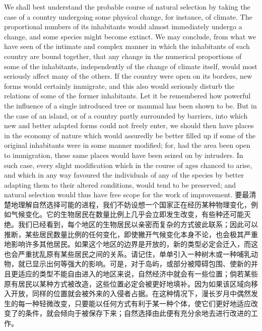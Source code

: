 \darwinpair
{We shall best understand the probable course of natural selection by taking the case of a country undergoing some physical change, for instance, of climate. The proportional numbers of its inhabitants would almost immediately undergo a change, and some species might become extinct. We may conclude, from what we have seen of the intimate and complex manner in which the inhabitants of each country are bound together, that any change in the numerical proportions of some of the inhabitants, independently of the change of climate itself, would most seriously affect many of the others. If the country were open on its borders, new forms would certainly immigrate, and this also would seriously disturb the relations of some of the former inhabitants. Let it be remembered how powerful the influence of a single introduced tree or mammal has been shown to be. But in the case of an island, or of a country partly surrounded by barriers, into which new and better adapted forms could not freely enter, we should then have places in the economy of nature which would assuredly be better filled up if some of the original inhabitants were in some manner modified; for, had the area been open to immigration, these same places would have been seized on by intruders. In such case, every slight modification which in the course of ages chanced to arise, and which in any way favoured the individuals of any of the species by better adapting them to their altered conditions, would tend to be preserved; and natural selection would thus have free scope for the work of improvement.}
{要最清楚地理解自然选择可能的进程，我们不妨设想一个国家正在经历某种物理变化，例如气候变化。它的生物居民在数量比例上几乎会立即发生改变，有些种还可能灭绝。我们已经看到，每个地区的生物居民以亲密而复杂的方式彼此联系；因此可以推断，某些居民数量比例的任何变化，即使撇开气候变化本身不论，也会极其严重地影响许多其他居民。如果这个地区的边界是开放的，新的类型必定会迁入，而这也会严重扰乱原有某些居民之间的关系。请记住，单单引入一种树木或一种哺乳动物，就已显示出何等强大的影响。可是，对于岛屿，或部分被障碍包围、使新的并且更适应的类型不能自由进入的地区来说，自然经济中就会有一些位置；倘若某些原有居民以某种方式被改造，这些位置必定会被更好地填补。因为如果该区域向移入开放，同样的位置就会被外来的入侵者占据。在这种情况下，漫长岁月中偶然发生的每一种轻微改变，只要能以任何方式有利于某一种个体，使它们更好地适应改变了的条件，就会倾向于被保存下来；自然选择由此便有充分余地去进行改进的工作。}

